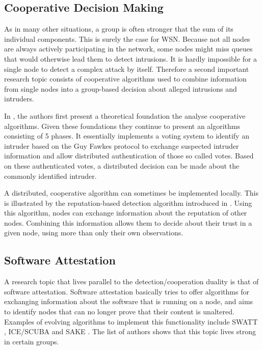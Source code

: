 \documentclass[conference]{IEEEtran}
\begin{document}
\subsection{Cooperative Decision Making}
\label{subsection:coorperative}

As in many other situations, a group is often stronger that the sum of its
individual components. This is surely the case for WSN. Because not all nodes
are always actively participating in the network, some nodes might miss queues
that would otherwise lead them to detect intrusions. It is hardly impossible
for a single node to detect a complex attack by itself. Therefore a second
important research topic consists of cooperative algorithms used to combine
information from single nodes into a group-based decision about alleged
intrusions and intruders.

In \cite{krontiris2009cooperative}, the authors first present a theoretical
foundation the analyse cooperative algorithms. Given these foundations they
continue to present an algorithms consisting of 5 phases. It essentially
implements a voting system to identify an intruder based on the Guy Fawkes
protocol \cite{anderson1998new} to exchange suspected intruder information and
allow distributed authentication of those so called votes. Based on these
authenticated votes, a distributed decision can be made about the commonly
identified intruder.

A distributed, cooperative algorithm can sometimes be implemented locally. This
is illustrated by the reputation-based detection algorithm introduced in
\cite{ganeriwal2008reputation}. Using this algorithm, nodes can exchange
information about the reputation of other nodes. Combining this information
allows them to decide about their trust in a given node, using more than only
their own observations.

\subsection{Software Attestation}
\label{subsection:attestation}

A research topic that lives parallel to the detection/cooperation duality is
that of software attestation. Software attestation basically tries to offer
algorithms for exchanging information about the software that is running on a
node, and aims to identify nodes that can no longer prove that their content is
unaltered. Examples of evolving algorithms to implement this functionality
include SWATT \cite{seshadri2004swatt}, ICE/SCUBA \cite{seshadri2006scuba} and
SAKE \cite{seshadri2008sake}. The list of authors shows that this topic lives
strong in certain groups.
\end{document}
